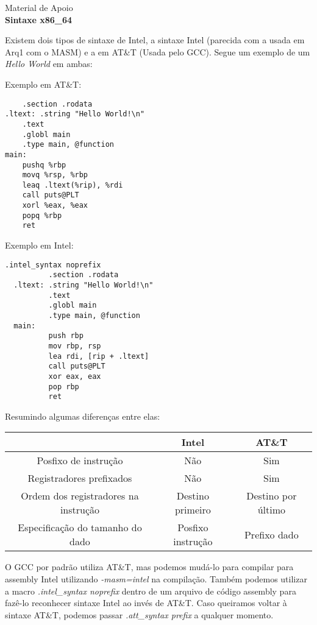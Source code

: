 \documentclass{compiladores}
\begin{document}
\begin{center}
{\LARGE Material de Apoio } \\
{\bf Sintaxe x86\_64}
\end{center}

Existem dois tipos de sintaxe de Intel, a sintaxe Intel (parecida com a usada em Arq1 com o MASM) e a em AT\&T (Usada pelo GCC). Segue um exemplo de um \textit{Hello World} em ambas:

Exemplo em AT\&T:
\begin{lstlisting}
	.section .rodata
.ltext: .string "Hello World!\n"
	.text
	.globl main
	.type main, @function
main:
	pushq %rbp
	movq %rsp, %rbp
	leaq .ltext(%rip), %rdi
	call puts@PLT
	xorl %eax, %eax
	popq %rbp
	ret
\end{lstlisting}

Exemplo em Intel:
\begin{lstlisting}
.intel_syntax noprefix
          .section .rodata
  .ltext: .string "Hello World!\n"
          .text
          .globl main
          .type main, @function
  main:
          push rbp
          mov rbp, rsp
          lea rdi, [rip + .ltext]
          call puts@PLT
          xor eax, eax
          pop rbp
          ret
\end{lstlisting}

Resumindo algumas diferenças entre elas:

\begin{centering}
\begin{tabular}{|c|c|c|}
	\hline
	& Intel & AT\&T\\
	\hline
	Posfixo de instrução & Não & Sim \\
	\hline
	Registradores prefixados & Não & Sim \\
	\hline
	Ordem dos registradores na instrução & Destino primeiro & Destino por último \\
	\hline
	Especificação do tamanho do dado & Posfixo instrução & Prefixo dado\\
	\hline
\end{tabular}
\end{centering}

O GCC por padrão utiliza AT\&T, mas podemos mudá-lo para compilar para assembly Intel utilizando \textit{-masm=intel} na compilação. Também podemos utilizar a macro \textit{.intel\_syntax noprefix} dentro de um arquivo de código assembly para fazê-lo reconhecer sintaxe Intel ao invés de AT\&T. Caso queiramos voltar à sintaxe AT\&T, podemos passar \textit{.att\_syntax prefix} a qualquer momento.
\end{document}
